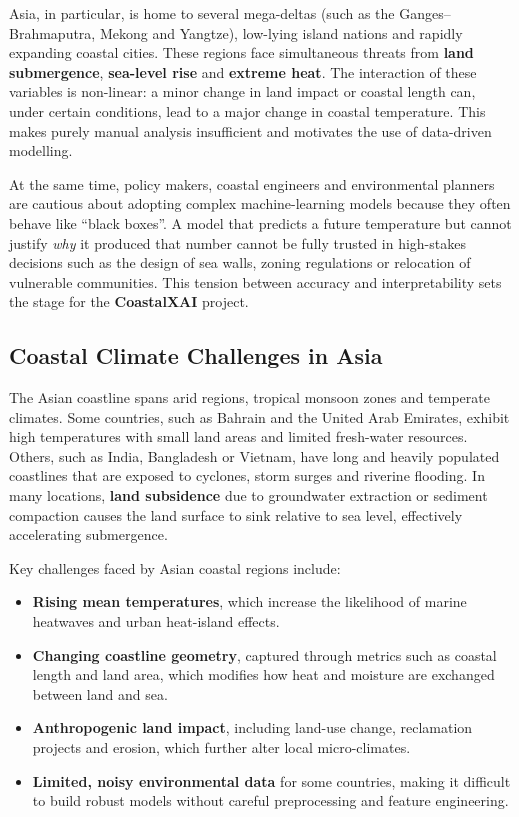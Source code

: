 \documentclass[12pt, a4paper]{article}
\begin{document}
Asia, in particular, is home to several mega-deltas (such as the Ganges–
Brahmaputra, Mekong and Yangtze), low-lying island nations and
rapidly expanding coastal cities. These regions face simultaneous threats
from \textbf{land submergence}, \textbf{sea-level rise} and \textbf{extreme heat}. The
interaction of these variables is non-linear: a minor change in land
impact or coastal length can, under certain conditions, lead to a major
change in coastal temperature. This makes purely manual analysis
insufficient and motivates the use of data-driven modelling.

At the same time, policy makers, coastal engineers and environmental
planners are cautious about adopting complex machine-learning models
because they often behave like ``black boxes''. A model that predicts a
future temperature but cannot justify \emph{why} it produced that number
cannot be fully trusted in high-stakes decisions such as the design of
sea walls, zoning regulations or relocation of vulnerable communities.
This tension between accuracy and interpretability sets the stage for the
\textbf{CoastalXAI} project.

\subsection{\textbf{Coastal Climate Challenges in Asia}}

The Asian coastline spans arid regions, tropical monsoon zones and
temperate climates. Some countries, such as Bahrain and the United Arab
Emirates, exhibit high temperatures with small land areas and limited
fresh-water resources. Others, such as India, Bangladesh or Vietnam,
have long and heavily populated coastlines that are exposed to cyclones,
storm surges and riverine flooding. In many locations, \textbf{land
subsidence} due to groundwater extraction or sediment compaction causes
the land surface to sink relative to sea level, effectively accelerating
submergence.

Key challenges faced by Asian coastal regions include:
\begin{itemize}
  \item \textbf{Rising mean temperatures}, which increase the likelihood of
  marine heatwaves and urban heat-island effects.
  \item \textbf{Changing coastline geometry}, captured through metrics such as
  coastal length and land area, which modifies how heat and moisture
  are exchanged between land and sea.
  \item \textbf{Anthropogenic land impact}, including land-use change,
  reclamation projects and erosion, which further alter local micro-climates.
  \item \textbf{Limited, noisy environmental data} for some countries,
  making it difficult to build robust models without careful
  preprocessing and feature engineering.
\end{itemize}
\end{document}
